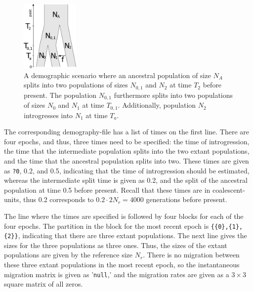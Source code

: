 \documentclass{article}
\numberwithin{equation}{section}
\begin{document}
\begin{figure}
  \begin{center}
    \includegraphics[width=0.25\textwidth]{graphics/introgression.pdf}
  \end{center} 
  \caption{A demographic scenario where an ancestral population of size $N_A$ splits into two populations of sizes $N_{0,1}$ and $N_2$ at time $T_2$ before present. The population $N_{0,1}$ furthermore splits into two populations of sizes $N_0$ and $N_1$ at time $T_{0,1}$. Additionally, population $N_2$ introgresses into $N_1$ at time $T_a$.}
  \label{fig_introgression}
\end{figure}

The corresponding demography-file has a list of times on the first line. There are four epochs, and thus, three times need to be specified: the time of introgression, the time that the intermediate population splits into the two extant populations, and the time that the ancestral population splits into two. These times are given as \texttt{?0}, 0.2, and 0.5, indicating that the time of introgression should be estimated, whereas the intermediate split time is given as 0.2, and the split of the ancestral population at time 0.5 before present. Recall that these times are in coalescent-units, thus 0.2 corresponds to $0.2 \cdot 2 N_r = 4000$ generations before present.

The line where the times are specified is followed by four blocks for each of the four epochs. The partition in the block for the most recent epoch is \texttt{\{\{0\},\{1\},\{2\}\}}, indicating that there are three extant populations. The next line gives the sizes for the three populations as three ones. Thus, the sizes of the extant populations are given by the reference size $N_r$. There is no migration between these three extant populations in the most recent epoch, so the instantaneous migration matrix is given as '\texttt{null},' and the migration rates are given as a $3 \times 3$ square matrix of all zeros.
\end{document}
